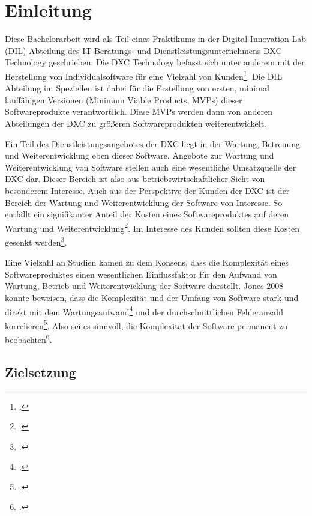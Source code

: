 \chapter{Einleitung}\label{einleitung}

Diese Bachelorarbeit wird als Teil eines Praktikums in der Digital
Innovation Lab (DIL) Abteilung des IT-Beratungs- und
Dienstleistungsunternehmens DXC Technology geschrieben. Die DXC
Technology befasst sich unter anderem mit der Herstellung von
Individualsoftware für eine Vielzahl von Kunden\footcite[Vgl. ][]{InterviewMitVertretern2022}.
Die DIL Abteilung im Speziellen ist dabei für die Erstellung von ersten,
minimal lauffähigen Versionen (Minimum Viable Products, MVPs) dieser
Softwareprodukte verantwortlich. Diese MVPs werden dann von anderen
Abteilungen der DXC zu größeren Softwareprodukten weiterentwickelt.

Ein Teil des Dienstleistungsangebotes der DXC liegt in der Wartung,
Betreuung und Weiterentwicklung eben dieser Software. Angebote zur
Wartung und Weiterentwicklung von Software stellen auch eine wesentliche
Umsatzquelle der DXC dar. Dieser Bereich ist also aus
betriebswirtschaftlicher Sicht von besonderem Interesse. Auch aus der
Perspektive der Kunden der DXC ist der Bereich der Wartung und
Weiterentwicklung der Software von Interesse. So entfällt ein
signifikanter Anteil der Kosten eines Softwareproduktes auf deren
Wartung und Weiterentwicklung\footcite[Vgl. ][S. 301]{jonesAppliedSoftwareMeasurement2008}. Im Interesse des
Kunden sollten diese Kosten gesenkt werden\footcite[Vgl. ][]{InterviewMitMitarbeiterin2022}.

Eine Vielzahl an Studien kamen zu dem Konsens, dass die Komplexität
eines Softwareproduktes einen wesentlichen Einflussfaktor für den
Aufwand von Wartung, Betrieb und Weiterentwicklung der Software
darstellt. Jones 2008 konnte beweisen, dass die Komplexität und der
Umfang von Software stark und direkt mit dem Wartungsaufwand\footcite[Vgl. ][S. 64, 335 und 627]{jonesAppliedSoftwareMeasurement2008} und der durchschnittlichen Fehleranzahl
korrelieren\footcite[Vgl. ][S. 64 und 503]{jonesAppliedSoftwareMeasurement2008}. Also sei es sinnvoll,
die Komplexität der Software permanent zu beobachten\footcite[Vgl. ][S. 503]{jonesAppliedSoftwareMeasurement2008}.

\section{Zielsetzung}\label{zielsetzung}

